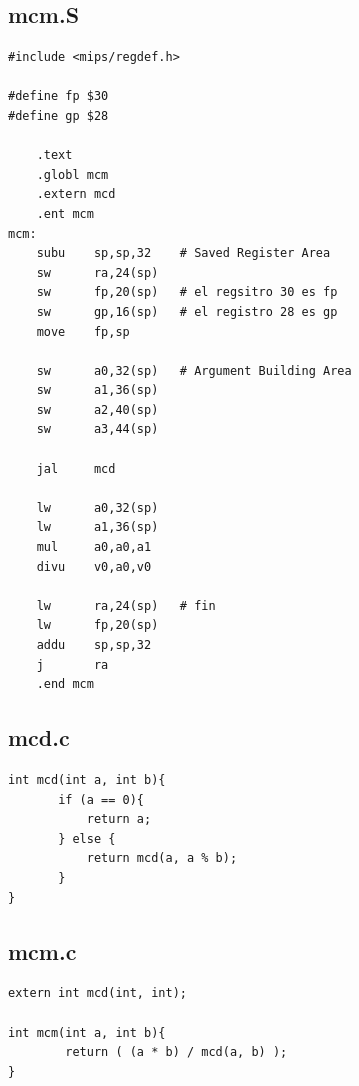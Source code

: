 \documentclass[a4paper,10pt]{article}
\begin{document}
  \subsection{mcm.S}
  \begin{verbatim}
#include <mips/regdef.h>

#define fp $30
#define gp $28

	.text
	.globl mcm
	.extern mcd
	.ent mcm
mcm:
	subu	sp,sp,32	# Saved Register Area
	sw		ra,24(sp)
	sw 		fp,20(sp)	# el regsitro 30 es fp
	sw 		gp,16(sp)	# el registro 28 es gp
	move 	fp,sp

	sw 		a0,32(sp)	# Argument Building Area	
	sw		a1,36(sp)
	sw		a2,40(sp)
	sw		a3,44(sp)

	jal 	mcd

	lw		a0,32(sp)
	lw		a1,36(sp)
	mul		a0,a0,a1
	divu	v0,a0,v0			

	lw 		ra,24(sp)	# fin
	lw 		fp,20(sp)
	addu 	sp,sp,32
	j 		ra
	.end mcm
  \end{verbatim}
  
  \subsection{mcd.c}
  \begin{verbatim}
int mcd(int a, int b){
	   if (a == 0){
	       return a;
	   } else {
	       return mcd(a, a % b);
	   }
}
    \end{verbatim}
    
   \subsection{mcm.c}
   \begin{verbatim}
extern int mcd(int, int);

int mcm(int a, int b){
	    return ( (a * b) / mcd(a, b) );
}

   \end{verbatim}
\end{document}
